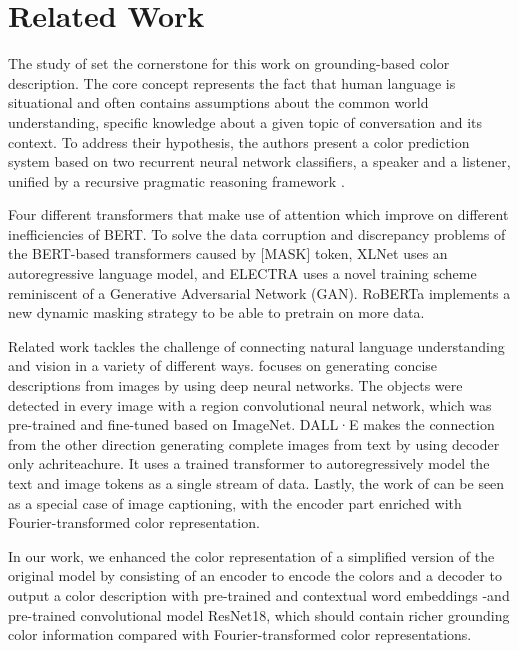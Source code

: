 \section{Related Work}

The study of \citep{monroe-2017-colors} set the cornerstone for this work on grounding-based color description. The core concept represents the fact that human language is situational and often contains assumptions about the common world understanding, specific knowledge about a given topic of conversation and its context. To address their hypothesis, the authors present a color prediction system based on two recurrent neural network classifiers, a speaker and a listener, unified by a recursive pragmatic reasoning framework \citep{monroe-2017-colors}.

\par
Four different transformers that make use of attention which improve on different inefficiencies of BERT. To solve the data corruption and discrepancy problems of the BERT-based transformers caused by [MASK] token, XLNet uses an autoregressive language model, and ELECTRA uses a novel training scheme reminiscent of a Generative Adversarial Network (GAN). RoBERTa implements a new dynamic masking strategy to be able to pretrain on more data.

\par
Related work tackles the challenge of connecting natural language understanding and vision in a variety of different ways. \citep{karpathy-2014-image_descriptions} focuses on generating concise descriptions from images by using deep neural networks. The objects were detected in every image with a region convolutional neural network, which was  pre-trained and fine-tuned based on ImageNet. DALL·E makes the connection from the other direction generating complete images from text by using decoder only achriteachure. It uses a trained transformer to autoregressively model the text and image tokens as a single stream of data. Lastly, the work of \citep{monroe-2017-colors} can be seen as a special case of image captioning, with the encoder part enriched with Fourier-transformed color representation.

\par
In our work, we enhanced the color representation of a simplified version of the original model by \citep{monroe-2017-colors} consisting of an encoder to encode the colors and a decoder to output a color description with pre-trained and contextual word embeddings -and pre-trained convolutional model ResNet18, which should contain richer grounding color information compared with Fourier-transformed color representations.

